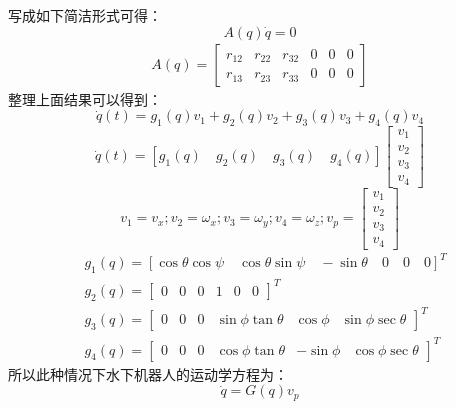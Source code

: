 写成如下简洁形式可得：
\begin{equation}
    A(q)\dot{q}=0 
\end{equation}
\begin{equation}
    \begin{aligned}
A(q)=\begin{bmatrix}r_{12}&r_{22}&r_{32}&0&0&0\\r_{13}&r_{23}&r_{33}&0&0&0\end{bmatrix}
\end{aligned}   
\end{equation}
整理上面结果可以得到：
\begin{equation}
    \dot{q}(t)=g_1(q)v_1+g_2(q)v_2+g_3(q)v_3+g_4(q)v_4
\end{equation}
\begin{equation}
    \dot{q}(t)=[g_1(q)\quad g_2(q)\quad g_3(q)\quad g_4(q)]\begin{bmatrix}v_1\\v_2\\v_3\\v_4\end{bmatrix}
\end{equation}
\begin{equation}
    v_1=v_x;v_2=\omega_x;v_3=\omega_y;v_4=\omega_z;v_p = \begin{bmatrix}v_1\\v_2\\v_3\\v_4\end{bmatrix}
\end{equation}
\begin{equation}
    \begin{aligned}
&g_{1}(q) =[\cos\theta\cos\psi\quad\cos\theta\sin\psi\quad-\sin\theta\quad0\quad0\quad0]^T \\
&g_2(q) =[\begin{matrix}0&0&0&1&0&0\end{matrix}]^T \\
&g_{3}(q) =\begin{bmatrix}0&0&0&\sin\phi\tan\theta&\cos\phi&\sin\phi\sec\theta\end{bmatrix}^T \\
&g_{4}(q) =\begin{bmatrix}0&0&0&\cos\phi\tan\theta&-\sin\phi&\cos\phi\sec\theta\end{bmatrix}^T 
\end{aligned}
\end{equation}
所以此种情况下水下机器人的运动学方程为：
\begin{equation}
    \dot{q}=G(q)v_p
\end{equation}
